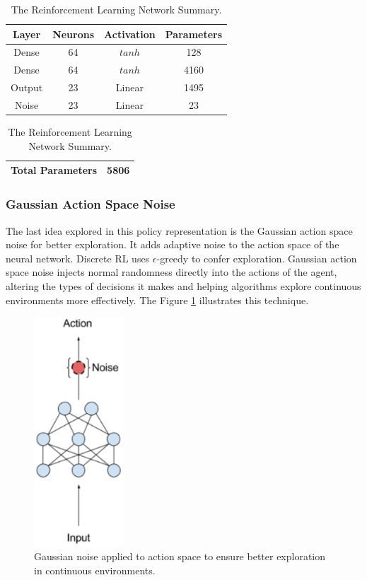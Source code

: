 \begin{table}[htbp]
	\caption{The Reinforcement Learning Network Summary.}
	\begin{center}
		\begin{tabular}{|c|c|c|c|}
			\hline
			\textbf{Layer}&{\textbf{Neurons}}& \textbf{Activation}& \textbf{Parameters} \\
			\hline
			Dense & 64 & $tanh$ & 128  \\
			\hline
			Dense & 64 & $tanh$ & 4160 \\
			\hline
			Output & 23 & Linear & 1495 \\
			\hline
			Noise & 23 & Linear & 23 \\
			\hline
		\end{tabular}
		\begin{tabular}{|c|c|}
			\hline
			\textbf{Total Parameters} & 5806 \\
			\hline
		\end{tabular}
		\label{tab:rl_network_summary}
	\end{center}
\end{table}


\subsubsection{Gaussian Action Space Noise}\label{gasp}

The last idea explored in this policy representation is the Gaussian action space noise for better exploration. It adds adaptive noise to the action space of the neural network. Discrete RL uses $\epsilon$-greedy \cite{Watkins:1989} to confer exploration. Gaussian action space noise injects normal randomness directly into the actions of the agent, altering the types of decisions it makes and helping algorithms explore continuous environments more effectively. The Figure \ref{gaussiannoise} illustrates this technique.


\begin{figure}[!htbp]
	\centering
	\includegraphics[width=0.3\textwidth]{Cap5/gaussiannoise.eps}
	\caption{Gaussian noise applied to action space to ensure better exploration in continuous environments.
	\cite{parameternoiseblog}
	}
	\label{gaussiannoise}
\end{figure}

